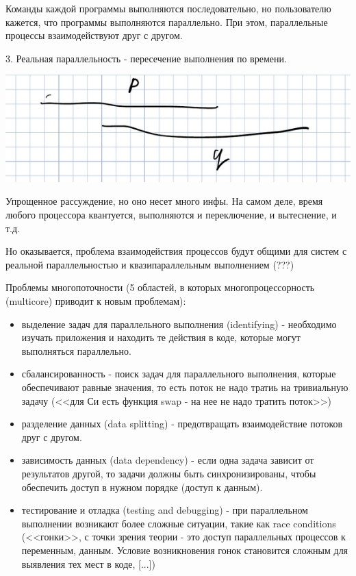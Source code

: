 \documentclass[a4paper, 12pt]{report}
\begin{document}
	Команды каждой программы выполняются последовательно, но пользователю кажется, что программы выполняются параллельно. При этом, параллельные процессы взаимодействуют друг с другом.
	
	3. Реальная параллельность - пересечение выполнения по времени.
	
	\includegraphics[width=\linewidth]{4}
	
	Упрощенное рассуждение, но оно несет много инфы. На самом деле, время любого процессора квантуется, выполняются и переключение, и вытеснение, и т.д.
	
	Но оказывается, проблема взаимодействия процессов будут общими для систем с реальной параллельностью и квазипараллельным выполнением (???)
	
	Проблемы многопоточности (5 областей, в которых многопроцессорность (multicore) приводит к новым проблемам):
	
	\begin{itemize}
		\item выделение задач для параллельного выполнения (identifying) - необходимо изучать приложения и находить те действия в коде, которые могут выполняться параллельно.
		
		\item сбалансированность - поиск задач для параллельного выполнения, которые обеспечивают равные значения, то есть поток не надо тратиь на тривиальную задачу (<<для Си есть функция swap - на нее не надо тратить поток>>)
		
		\item разделение данных (data splitting) - предотвращать взаимодействие потоков друг с другом.
		
		\item зависимость данных (data dependency) - если одна задача зависит от результатов другой, то задачи должны быть синхронизированы, чтобы обеспечить доступ в нужном порядке (доступ к данным).
		
		\item тестирование и отладка (testing and debugging) - при параллельном выполнении возникают более сложные ситуации, такие как race conditions (<<гонки>>, с точки зрения теории - это доступ параллельных процессов к переменным, данным. Условие возникновения гонок становится сложным для выявления тех мест в коде, [...])
	\end{itemize}
	
\end{document}
